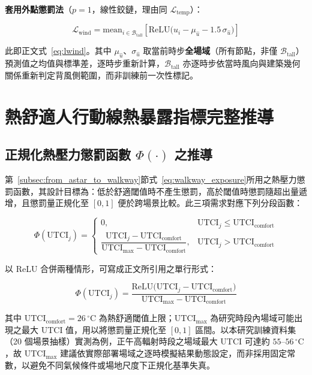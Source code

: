 \noindent\textbf{套用外點懲罰法}（$p=1$，線性鉸鏈，理由同 $\mathcal{L}_{\text{temp}}$）：

\begin{equation}
    \mathcal{L}_{\text{wind}} = \text{mean}_{i \in \mathcal{B}_{\text{tall}}}\!\left[\text{ReLU}\big(\hat{u}_i - \mu_{\hat{u}} - 1.5\,\sigma_{\hat{u}}\big)\right]
\end{equation}

此即正文式~\eqref{eq:lwind}。其中 $\mu_{\hat{u}}$、$\sigma_{\hat{u}}$ 取當前時步\textbf{全場域}（所有節點，非僅 $\mathcal{B}_{\text{tall}}$）預測值之均值與標準差，逐時步重新計算，$\mathcal{B}_{\text{tall}}$ 亦逐時步依當時風向與建築幾何關係重新判定背風側範圍，而非訓練前一次性標記。


\section{熱舒適人行動線熱暴露指標完整推導}
\label{appx:walkway_derivation}

\subsection{正規化熱壓力懲罰函數 $\Phi(\cdot)$ 之推導}

第~\ref{subsec:from_astar_to_walkway}節式~\eqref{eq:walkway_exposure}所用之熱壓力懲罰函數，其設計目標為：低於舒適閾值時不產生懲罰，高於閾值時懲罰隨超出量遞增，且懲罰量正規化至 $[0,1]$ 便於跨場景比較。此三項需求對應下列分段函數：

\begin{equation}
    \Phi(\text{UTCI}_j) =
    \begin{cases}
        0, & \text{UTCI}_j \le \text{UTCI}_{\text{comfort}} \\[4pt]
        \dfrac{\text{UTCI}_j - \text{UTCI}_{\text{comfort}}}{\text{UTCI}_{\text{max}} - \text{UTCI}_{\text{comfort}}}, & \text{UTCI}_j > \text{UTCI}_{\text{comfort}}
    \end{cases}
    \label{eq:penalty_appx}
\end{equation}

以 ReLU 合併兩種情形，可寫成正文所引用之單行形式：

\begin{equation}
    \Phi(\text{UTCI}_j) = \frac{\text{ReLU}\big(\text{UTCI}_j - \text{UTCI}_{\text{comfort}}\big)}{\text{UTCI}_{\text{max}} - \text{UTCI}_{\text{comfort}}}
\end{equation}

其中 $\text{UTCI}_{\text{comfort}} = 26\,^\circ\text{C}$ 為熱舒適閾值上限；$\text{UTCI}_{\text{max}}$ 為研究時段內場域可能出現之最大 UTCI 值，用以將懲罰量正規化至 $[0,1]$ 區間。以本研究訓練資料集（20 個場景抽樣）實測為例，正午高輻射時段之場域最大 UTCI 可達約 $55$--$56\,^\circ\text{C}$，故 $\text{UTCI}_{\text{max}}$ 建議依實際部署場域之逐時模擬結果動態設定，而非採用固定常數，以避免不同氣候條件或場地尺度下正規化基準失真。

